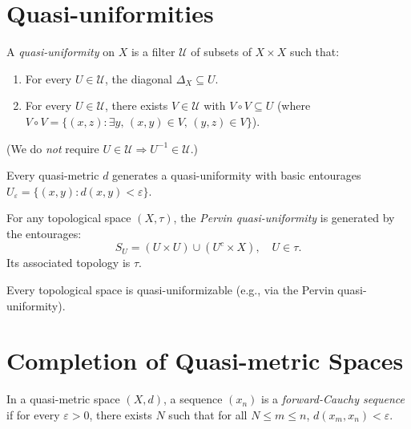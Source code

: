\section{Quasi-uniformities}

\begin{definition}
A \emph{quasi-uniformity} on $X$ is a filter $\mathcal{U}$ of subsets of $X \times X$ such
that:
\begin{enumerate}
  \item For every $U \in \mathcal{U}$, the diagonal $\Delta_X \subseteq U$.
  \item For every $U \in \mathcal{U}$, there exists $V \in \mathcal{U}$ with
    $V \circ V \subseteq U$ (where $V \circ V = \{(x,z) : \exists y,\, (x,y) \in V,\,
    (y,z) \in V\}$).
\end{enumerate}
(We do \emph{not} require $U \in \mathcal{U} \Rightarrow U^{-1} \in \mathcal{U}$.)
\end{definition}

\begin{proposition}
Every quasi-metric $d$ generates a quasi-uniformity with basic entourages
$U_\varepsilon = \{(x,y) : d(x,y) < \varepsilon\}$.
\end{proposition}

\begin{definition}
For any topological space $(X,\tau)$, the \emph{Pervin quasi-uniformity} is generated by
the entourages:
\[
  S_U = (U \times U) \cup (U^c \times X), \quad U \in \tau.
\]
Its associated topology is $\tau$.
\end{definition}

\begin{theorem}
Every topological space is quasi-uniformizable (e.g., via the Pervin quasi-uniformity).
\end{theorem}

\section{Completion of Quasi-metric Spaces}

\begin{definition}
In a quasi-metric space $(X,d)$, a sequence $(x_n)$ is a \emph{forward-Cauchy sequence} if
for every $\varepsilon > 0$, there exists $N$ such that for all $N \leq m \leq n$,
$d(x_m, x_n) < \varepsilon$.
\end{definition}

